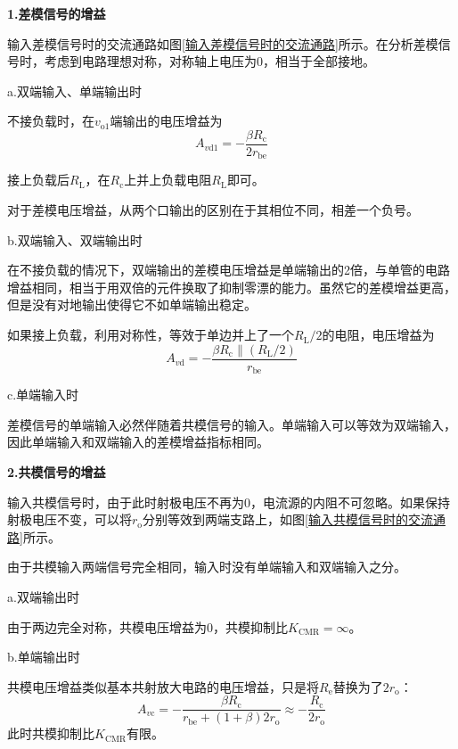 \textbf{1.差模信号的增益}

输入差模信号时的交流通路如图\ref{输入差模信号时的交流通路}所示。在分析差模信号时，考虑到电路理想对称，对称轴上电压为0，相当于全部接地。

a.双端输入、单端输出时

不接负载时，在$v_{\mathrm{o1}}$端输出的电压增益为
\begin{equation}
    A_{v\mathrm{d1}}=-\frac{\beta R_\mathrm{c}}{2r_\mathrm{be}}
\end{equation}

接上负载后$R_\mathrm{L}$，在$R_\mathrm{c}$上并上负载电阻$R_\mathrm{L}$即可。

对于差模电压增益，从两个口输出的区别在于其相位不同，相差一个负号。

b.双端输入、双端输出时

在不接负载的情况下，双端输出的差模电压增益是单端输出的2倍，与单管的电路增益相同，相当于用双倍的元件换取了抑制零漂的能力。虽然它的差模增益更高，但是没有对地输出使得它不如单端输出稳定。

如果接上负载，利用对称性，等效于单边并上了一个$R_\mathrm{L}/2$的电阻，电压增益为
\begin{equation}
    A_{v\mathrm{d}}=-\frac{\beta R_\mathrm{c} \parallel (R_\mathrm{L}/2)}{r_\mathrm{be}}
\end{equation}

c.单端输入时

差模信号的单端输入必然伴随着共模信号的输入。单端输入可以等效为双端输入，因此单端输入和双端输入的差模增益指标相同。

\textbf{2.共模信号的增益}

输入共模信号时，由于此时射极电压不再为0，电流源的内阻不可忽略。如果保持射极电压不变，可以将$r_\mathrm{o}$分别等效到两端支路上，如图\ref{输入共模信号时的交流通路}所示。

由于共模输入两端信号完全相同，输入时没有单端输入和双端输入之分。

a.双端输出时

由于两边完全对称，共模电压增益为0，共模抑制比$K_{\mathrm{CMR}}=\infty$。

b.单端输出时

共模电压增益类似基本共射放大电路的电压增益，只是将$R_\mathrm{e}$替换为了$2r_\mathrm{o}$：
\begin{equation}
    A_{v\mathrm{c}}=-\frac{\beta R_\mathrm{c}}{r_\mathrm{be}+(1+\beta)2r_\mathrm{o}}\approx -\frac{R_\mathrm{c}}{2r_\mathrm{o}}
\end{equation}
此时共模抑制比$K_{\mathrm{CMR}}$有限。

